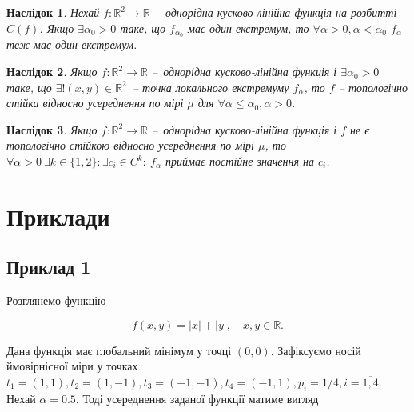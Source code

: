 \documentclass[12pt]{article}
\newtheorem{collocation}{Наслідок}
\begin{document}
\begin{collocation}
	Нехай $f:\mathbb{R}^2\rightarrow \mathbb{R}$ – однорідна кусково-лінійна функція на розбитті $C(f)$. Якщо $\exists \alpha_0>0$ таке, що $f_{\alpha_0}$ має один екстремум, то $\forall \alpha>0, \alpha<\alpha_0$ $f_\alpha$ теж має один екстремум.
\end{collocation}

\begin{collocation}
	Якщо $f:\mathbb{R}^2\rightarrow \mathbb{R}$ – однорідна кусково-лінійна функція і $\exists \alpha_0>0$ таке, що $\exists!(x,y)\in \mathbb{R}^2$ – точка локального екстремуму $f_\alpha$, то $f$ – топологічно стійка відносно усереднення по мірі $\mu$ для $\forall \alpha\leq\alpha_0, \alpha>0$.
\end{collocation}

\begin{collocation}
	Якщо $f:\mathbb{R}^2\rightarrow \mathbb{R}$ – однорідна кусково-лінійна функція і $f$  не є топологічно стійкою відносно усереднення по мірі $\mu$, то $\forall \alpha>0 \ \exists k\in \{1,2\}:  \exists c_i\in C^k: \ f_\alpha$ приймає постійне значення на $c_i$.
\end{collocation}


\section{Приклади} \label{quad}



\subsection{Приклад 1}

Розглянемо функцію

\begin{equation}
	\label{mod_function}
	f(x,y)=|x|+|y|, \quad x,y \in \mathbb{R}.
\end{equation}

Дана функція має глобальний мінімум у точці $(0,0)$. Зафіксуємо носій ймовірнісної міри у точках $t_1=(1, 1), t_2=(1, -1), t_3=(-1, -1), t_4=(-1, 1), p_{i}=1/4, i=\overline{1,4}$. Нехай $\alpha=0.5$. Тоді усереднення заданої функції матиме вигляд
\end{document}
